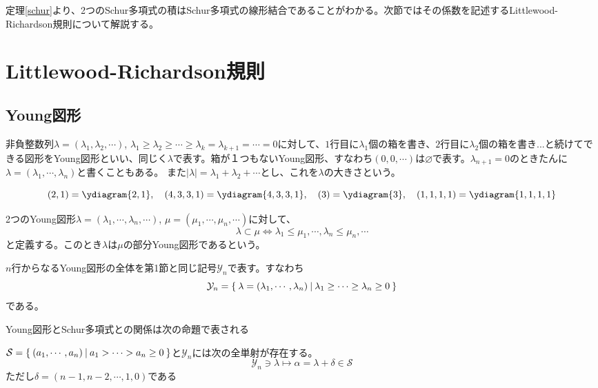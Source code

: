 \documentclass{ltjsreport}
\begin{document}
定理\ref{schur}より、2つのSchur多項式の積はSchur多項式の線形結合であることがわかる。次節ではその係数を記述するLittlewood-Richardson規則について解説する。





\section{Littlewood-Richardson規則}
\subsection{Young図形}
\begin{defin}
    非負整数列$\lambda=(\lambda_1,\lambda_2,\cdots)$, $\lambda_1\geq\lambda_2\geq\cdots\geq \lambda_{k}=\lambda_{k+1}=\cdots=0$に対して、$1$行目に$\lambda_1$個の箱を書き、$2$行目に$\lambda_2$個の箱を書き...と続けてできる図形をYoung図形といい、同じく$\lambda$で表す。箱が１つもないYoung図形、すなわち$(0,0,\cdots)$は$\varnothing$で表す。$\lambda_{n+1}=0$のときたんに$\lambda=(\lambda_1,\cdots,\lambda_n)$と書くこともある。
    また$|\lambda|=\lambda_1+\lambda_2+\cdots$とし、これを$\lambda$の大きさという。
\end{defin}

\begin{eg}
    \[
    (2,1)=\ydiagram{2,1},\quad (4,3,3,1)=\ydiagram{4,3,3,1},\quad (3)=\ydiagram{3},\quad (1,1,1,1)=\ydiagram{1,1,1,1}
    \]
\end{eg}

\begin{defin}
    2つのYoung図形$\lambda=(\lambda_1,\cdots,\lambda_n,\cdots)$, $\mu=(\mu_1,\cdots,\mu_n,\cdots)$に対して、
    \[
    \lambda\subset \mu\Leftrightarrow \lambda_1\leq \mu_1,\cdots,\lambda_n\leq\mu_n,\cdots   
    \]
    と定義する。このとき$\lambda$は$\mu$の部分Young図形であるという。
\end{defin}

\begin{defin}
    $n$行からなるYoung図形の全体を第1節と同じ記号$\mathcal{Y}_n$で表す。すなわち
    \[
    \mathcal{Y}_n=\left\{\:\lambda=(\lambda_1,\cdots,\lambda_n)\:\middle|\:\lambda_1\geq \cdots\geq\lambda_n\geq 0\:\right\}
    \]
    である。
\end{defin}



Young図形とSchur多項式との関係は次の命題で表される
\begin{prop}
    $\mathcal{S}=\left\{\:(a_1,\cdots,a_n)\:\middle|\:a_1>\cdots>a_n\geq 0\:\right\}$と$\mathcal{Y}_n$には次の全単射が存在する。
    \[
    \mathcal{Y}_n\owns \lambda \mapsto \alpha=\lambda+\delta \in\mathcal{S}   
    \]
    ただし$\delta=(n-1,n-2,\cdots,1,0)$である
\end{prop}
\end{document}
